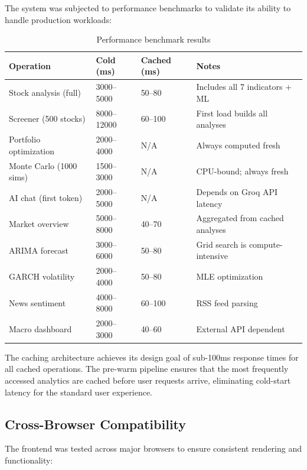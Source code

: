 \documentclass[12pt, a4paper, oneside]{report}
\begin{document}
The system was subjected to performance benchmarks to validate its ability to handle production workloads:

\begin{table}[H]
\centering
\caption{Performance benchmark results}
\label{tab:performance_bench}
\begin{tabularx}{\textwidth}{@{}l l l X@{}}
\toprule
\textbf{Operation} & \textbf{Cold (ms)} & \textbf{Cached (ms)} & \textbf{Notes} \\
\midrule
Stock analysis (full) & 3000--5000 & 50--80 & Includes all 7 indicators + ML \\
Screener (500 stocks) & 8000--12000 & 60--100 & First load builds all analyses \\
Portfolio optimization & 2000--4000 & N/A & Always computed fresh \\
Monte Carlo (1000 sims) & 1500--3000 & N/A & CPU-bound; always fresh \\
AI chat (first token) & 2000--5000 & N/A & Depends on Groq API latency \\
Market overview & 5000--8000 & 40--70 & Aggregated from cached analyses \\
ARIMA forecast & 3000--6000 & 50--80 & Grid search is compute-intensive \\
GARCH volatility & 2000--4000 & 50--80 & MLE optimization \\
News sentiment & 4000--8000 & 60--100 & RSS feed parsing \\
Macro dashboard & 2000--3000 & 40--60 & External API dependent \\
\bottomrule
\end{tabularx}
\end{table}

The caching architecture achieves its design goal of sub-100ms response times for all cached operations. The pre-warm pipeline ensures that the most frequently accessed analytics are cached before user requests arrive, eliminating cold-start latency for the standard user experience.

\subsection{Cross-Browser Compatibility}

The frontend was tested across major browsers to ensure consistent rendering and functionality:
\end{document}
